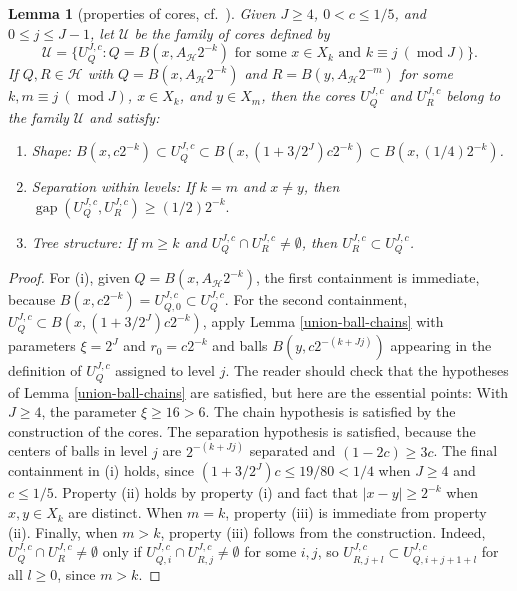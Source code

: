 \documentclass[12pt]{amsart}
\numberwithin{equation}{section}
\theoremstyle{plain}
\newtheorem{lemma}[theorem]{Lemma}
\theoremstyle{definition}
\newcommand{\Mod}{\operatorname{mod}}
\newcommand{\gap}{\mathop\mathrm{gap}\nolimits}
\numberwithin{figure}{section}
\begin{document}
\begin{lemma}[properties of cores, cf.~{\cite[Lemma 3.19]{Schul-Hilbert}}] \label{core-family} Given $J\geq 4$, $0<c\leq 1/5$, and $0\leq j\leq J-1$, let $\mathscr{U}$ be the family of cores defined by $$\mathscr{U}=\{U^{J,c}_Q:Q=B(x,A_\mathscr{H}2^{-k})\text{ for some } x\in X_k\text{ and }k\equiv j\ (\Mod J)\}.$$ If $Q,R\in\mathscr{H}$ with $Q=B(x,A_\mathscr{H}2^{-k})$ and $R=B(y,A_\mathscr{H}2^{-m})$ for some $k,m\equiv j\ (\Mod J)$, $x\in X_k$, and $y\in X_m$, then the cores $U^{J,c}_Q$ and $U^{J,c}_R$ belong to the family $\mathscr{U}$ and satisfy: \begin{enumerate}
\item[(i)] Shape: $B(x,c2^{-k})\subset U^{J,c}_Q \subset B(x, (1+3/2^J)c2^{-k})\subset B(x,(1/4)2^{-k})$.
\item[(ii)] Separation within levels: If $k=m$ and $x\neq y$, then $\gap(U^{J,c}_Q,U^{J,c}_R) \geq (1/2)2^{-k}.$
\item[(iii)] Tree structure: If $m\geq k$ and $U^{J,c}_Q\cap U^{J,c}_R\neq\emptyset$, then $U^{J,c}_R\subset U^{J,c}_Q$.
\end{enumerate}\end{lemma}

\begin{proof} For (i), given $Q=B(x,A_\mathscr{H}2^{-k})$, the first containment is immediate, because $B(x,c2^{-k})=U^{J,c}_{Q,0}\subset U^{J,c}_Q$. For the second containment, $U^{J,c}_Q\subset B(x,(1+3/2^J)c2^{-k})$, apply Lemma \ref{union-ball-chains} with parameters $\xi=2^J$ and $r_0=c2^{-k}$ and balls $B(y,c2^{-(k+Jj)})$ appearing in the definition of $U^{J,c}_Q$ assigned to level $j$. The reader should check that the hypotheses of Lemma \ref{union-ball-chains} are satisfied, but here are the essential points: With $J\geq 4$, the parameter $\xi\geq 16>6$. The chain hypothesis is satisfied by the construction of the cores. The separation hypothesis is satisfied, because the centers of balls in level $j$ are $2^{-(k+Jj)}$ separated and $(1-2c)\geq 3c$. The final containment in (i) holds, since $(1+3/2^J)c\leq 19/80<1/4$ when $J\geq 4$ and $c\leq 1/5$. Property (ii) holds by property (i) and fact that $|x-y|\geq 2^{-k}$ when $x,y \in X_k$ are distinct. When $m=k$, property (iii) is immediate from property (ii). Finally, when $m>k$, property (iii) follows from the construction. Indeed, $U_Q^{J,c}\cap U_R^{J,c}\neq\emptyset$ only if $U_{Q,i}^{J,c}\cap U_{R,j}^{J,c}\neq\emptyset$ for some $i,j$, so $U_{R,j+l}^{J,c}\subset U_{Q,i+j+1+l}^{J,c}$ for all $l\geq 0$, since $m>k$.\end{proof}
\end{document}
